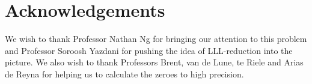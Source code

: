 \documentclass{article}
\numberwithin{equation}{section}
\begin{document}
\section*{Acknowledgements}
We wish to thank Professor Nathan Ng for bringing our attention to this problem and Professor Soroosh Yazdani for pushing the idea of LLL-reduction into the picture. We also wish to thank Professors Brent, van de Lune, te Riele and Arias de Reyna for helping us to calculate the zeroes to high precision.



\end{document}
